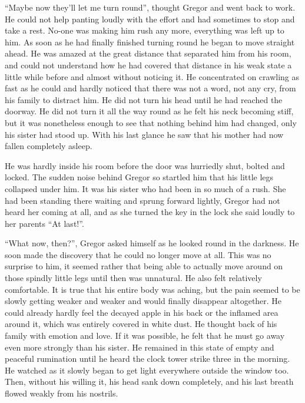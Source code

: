 “Maybe now they’ll let me turn round”, thought Gregor and went back to
work. He could not help panting loudly with the effort and had
sometimes to stop and take a rest. No-one was making him rush any more,
everything was left up to him. As soon as he had finally finished
turning round he began to move straight ahead. He was amazed at the
great distance that separated him from his room, and could not
understand how he had covered that distance in his weak state a little
while before and almost without noticing it. He concentrated on
crawling as fast as he could and hardly noticed that there was not a
word, not any cry, from his family to distract him. He did not turn his
head until he had reached the doorway. He did not turn it all the way
round as he felt his neck becoming stiff, but it was nonetheless enough
to see that nothing behind him had changed, only his sister had stood
up. With his last glance he saw that his mother had now fallen
completely asleep.

He was hardly inside his room before the door was hurriedly shut,
bolted and locked. The sudden noise behind Gregor so startled him that
his little legs collapsed under him. It was his sister who had been in
so much of a rush. She had been standing there waiting and sprung
forward lightly, Gregor had not heard her coming at all, and as she
turned the key in the lock she said loudly to her parents “At last!”.

“What now, then?”, Gregor asked himself as he looked round in the
darkness. He soon made the discovery that he could no longer move at
all. This was no surprise to him, it seemed rather that being able to
actually move around on those spindly little legs until then was
unnatural. He also felt relatively comfortable. It is true that his
entire body was aching, but the pain seemed to be slowly getting weaker
and weaker and would finally disappear altogether. He could already
hardly feel the decayed apple in his back or the inflamed area around
it, which was entirely covered in white dust. He thought back of his
family with emotion and love. If it was possible, he felt that he must
go away even more strongly than his sister. He remained in this state
of empty and peaceful rumination until he heard the clock tower strike
three in the morning. He watched as it slowly began to get light
everywhere outside the window too. Then, without his willing it, his
head sank down completely, and his last breath flowed weakly from his
nostrils.

